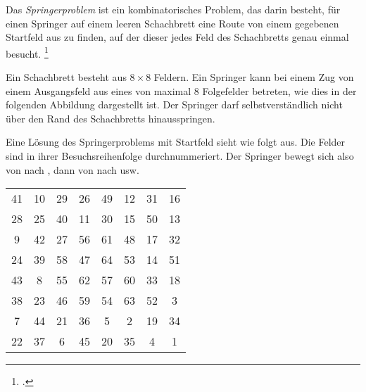 \documentclass{bschlangaul-aufgabe}
\begin{document}

\let\j=\bJavaCode

Das \emph{Springerproblem} ist ein kombinatorisches Problem, das darin
besteht, für einen Springer auf einem leeren Schachbrett eine Route von
einem gegebenen Startfeld aus zu finden, auf der dieser jedes Feld des
Schachbretts genau einmal besucht.
\footcite[Seite 11-12]{examen:46115:2018:09}

Ein Schachbrett besteht aus $8 \times 8$ Feldern. Ein Springer kann bei
einem Zug von einem Ausgangsfeld aus eines von maximal $8$ Folgefelder
betreten, wie dies in der folgenden Abbildung dargestellt ist. Der
Springer darf selbstverständlich nicht über den Rand des Schachbretts
hinausspringen.

\begin{center}
\end{center}

Eine Lösung des Springerproblems mit Startfeld \j{h1} sieht wie folgt
aus. Die Felder sind in ihrer Besuchsreihenfolge durchnummeriert. Der
Springer bewegt sich also von \j{h1} nach \j{f2}, dann von \j{f2} nach
\j{h3} usw.

\begin{center}
\begin{tabular}{cccccccc}
41&10&29&26&49&12&31&16\\
28&25&40&11&30&15&50&13\\
9&42&27&56&61&48&17&32\\
24&39&58&47&64&53&14&51\\
43&8&55&62&57&60&33&18\\
38&23&46&59&54&63&52&3\\
7&44&21&36&5&2&19&34\\
22&37&6&45&20&35&4&1\\
\end{tabular}
\end{center}
\end{document}
